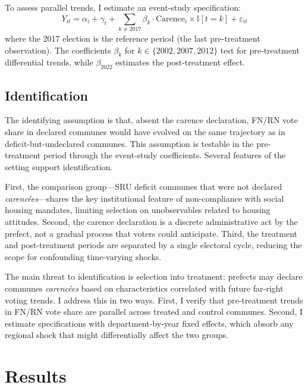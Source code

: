 \documentclass[12pt]{article}
\newcommand{\ind}{\mathbb{I}}
\begin{document}
To assess parallel trends, I estimate an event-study specification:
\begin{equation}
\label{eq:event}
Y_{it} = \alpha_i + \gamma_t + \sum_{k \neq 2017} \beta_k \cdot \text{Carence}_i \times \ind[t = k] + \varepsilon_{it}
\end{equation}
where the 2017 election is the reference period (the last pre-treatment observation). The coefficients $\beta_k$ for $k \in \{2002, 2007, 2012\}$ test for pre-treatment differential trends, while $\beta_{2022}$ estimates the post-treatment effect.

\subsection{Identification}

The identifying assumption is that, absent the carence declaration, FN/RN vote share in declared communes would have evolved on the same trajectory as in deficit-but-undeclared communes. This assumption is testable in the pre-treatment period through the event-study coefficients. Several features of the setting support identification.

First, the comparison group---SRU deficit communes that were not declared \textit{caren\-c\'{e}es}---shares the key institutional feature of non-compliance with social housing mandates, limiting selection on unobservables related to housing attitudes. Second, the carence declaration is a discrete administrative act by the prefect, not a gradual process that voters could anticipate. Third, the treatment and post-treatment periods are separated by a single electoral cycle, reducing the scope for confounding time-varying shocks.

The main threat to identification is selection into treatment: prefects may declare communes \textit{caren\-c\'{e}es} based on characteristics correlated with future far-right voting trends. I address this in two ways. First, I verify that pre-treatment trends in FN/RN vote share are parallel across treated and control communes. Second, I estimate specifications with department-by-year fixed effects, which absorb any regional shock that might differentially affect the two groups.


\section{Results}
\end{document}
